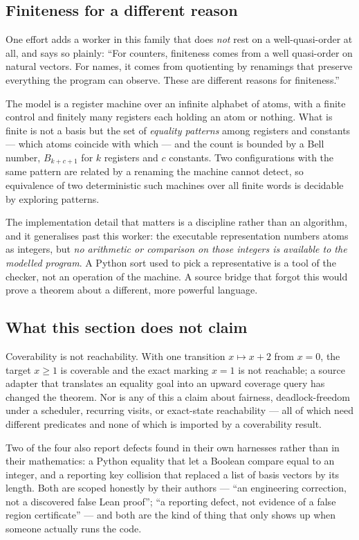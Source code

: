 \subsection{Finiteness for a different reason}

One effort adds a worker in this family that does \emph{not} rest on a
well-quasi-order at all, and says so plainly: ``For counters, finiteness comes
from a well quasi-order on natural vectors. For names, it comes from
quotienting by renamings that preserve everything the program can observe.
These are different reasons for finiteness.''

The model is a register machine over an infinite alphabet of atoms, with a
finite control and finitely many registers each holding an atom or nothing.
What is finite is not a basis but the set of \emph{equality patterns} among
registers and constants --- which atoms coincide with which --- and the count is
bounded by a Bell number, $B_{k+c+1}$ for $k$ registers and $c$ constants. Two
configurations with the same pattern are related by a renaming the machine
cannot detect, so equivalence of two deterministic such machines over all
finite words is decidable by exploring patterns.

The implementation detail that matters is a discipline rather than an
algorithm, and it generalises past this worker: the executable representation
numbers atoms as integers, but \emph{no arithmetic or comparison on those
integers is available to the modelled program}. A Python sort used to pick a
representative is a tool of the checker, not an operation of the machine. A
source bridge that forgot this would prove a theorem about a different, more
powerful language.

\subsection{What this section does not claim}

Coverability is not reachability. With one transition $x\mapsto x+2$ from
$x=0$, the target $x\ge1$ is coverable and the exact marking $x=1$ is not
reachable; a source adapter that translates an equality goal into an upward
coverage query has changed the theorem. Nor is any of this a claim about
fairness, deadlock-freedom under a scheduler, recurring visits, or exact-state
reachability --- all of which need different predicates and none of which is
imported by a coverability result.

Two of the four also report defects found in their own harnesses rather than in
their mathematics: a Python equality that let a Boolean compare equal to an
integer, and a reporting key collision that replaced a list of basis vectors by
its length. Both are scoped honestly by their authors --- ``an engineering
correction, not a discovered false Lean proof''; ``a reporting defect, not
evidence of a false region certificate'' --- and both are the kind of thing that
only shows up when someone actually runs the code.

